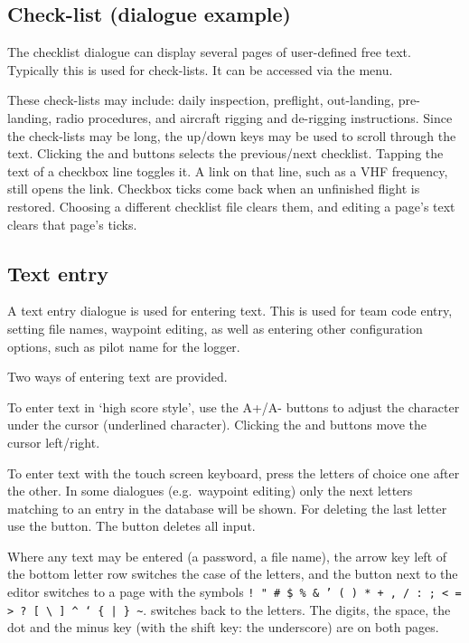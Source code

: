 \subsection*{Check-list (dialogue example)}\label{sec:checklist}

The checklist dialogue can display several pages of user-defined free text.
Typically this is used for check-lists. It can be accessed via the menu.

\blink{}

These check-lists may include: daily inspection, preflight,
out-landing, pre-landing, radio procedures, and aircraft rigging and
de-rigging instructions.  Since the check-lists may be long, the
up/down keys may be used to scroll through the text. Clicking the
\bmenuw{$<$} and \bmenuw{$>$} buttons selects the previous/next
checklist.  Tapping the text of a checkbox line toggles it.  A link
on that line, such as a VHF frequency, still opens the link.
Checkbox ticks come back when an unfinished flight is restored.
Choosing a different checklist file clears them, and editing a
page's text clears that page's ticks.


\subsection*{Text entry} \label{sec:textentry}

A text entry dialogue is used for entering text.  This is used for team
code entry, setting file names, waypoint editing, as well as entering
other configuration options, such as pilot name for the logger.

Two ways of entering text are provided. 

To enter text in `high score style', use the A+/A- buttons to adjust the 
character under the cursor (underlined character). Clicking the \button{$<$} 
and \button{$>$} buttons move the cursor left/right.  

To enter text with the touch screen keyboard, press the letters of choice 
one after the other. In some dialogues (e.g.\ waypoint editing) only the next
letters matching to an entry in the database will be shown. For deleting the 
last letter use the \button{$<-$} button. The  button deletes all input.

Where any text may be entered (a password, a file name), the arrow key
left of the bottom letter row switches the case of the letters, and the
\button{\#+=} button next to the editor switches to a page with the symbols
\texttt{! " \# \$ \% \& ' ( ) * + , / : ; < = > ? [ \textbackslash{} ] \textasciicircum{} ` \{ | \} \textasciitilde}.
 switches back to the letters.  The digits, the space, the
dot and the minus key (with the shift key: the underscore) are on both
pages.

